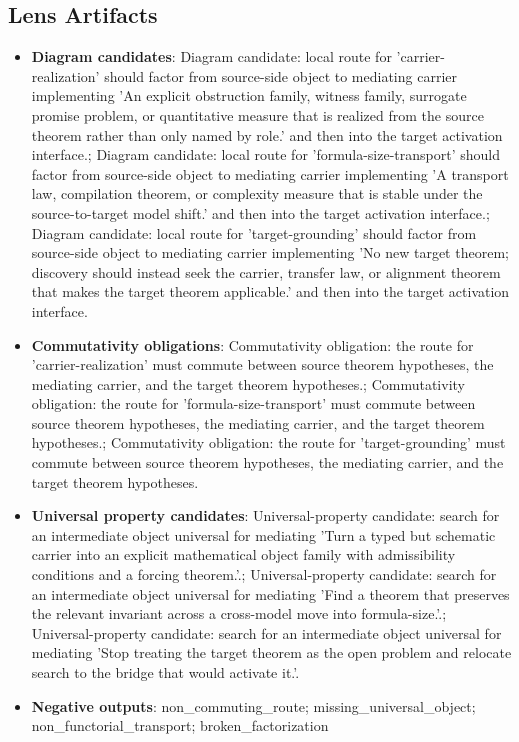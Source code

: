 \documentclass[11pt]{article}
\begin{document}
\subsection*{Lens Artifacts}
\begin{itemize}[leftmargin=*,itemsep=0.2em]
\item \textbf{Diagram candidates}: Diagram candidate: local route for 'carrier-realization' should factor from source-side object to mediating carrier implementing 'An explicit obstruction family, witness family, surrogate promise problem, or quantitative measure that is realized from the source theorem rather than only named by role.' and then into the target activation interface.; Diagram candidate: local route for 'formula-size-transport' should factor from source-side object to mediating carrier implementing 'A transport law, compilation theorem, or complexity measure that is stable under the source-to-target model shift.' and then into the target activation interface.; Diagram candidate: local route for 'target-grounding' should factor from source-side object to mediating carrier implementing 'No new target theorem; discovery should instead seek the carrier, transfer law, or alignment theorem that makes the target theorem applicable.' and then into the target activation interface.
\item \textbf{Commutativity obligations}: Commutativity obligation: the route for 'carrier-realization' must commute between source theorem hypotheses, the mediating carrier, and the target theorem hypotheses.; Commutativity obligation: the route for 'formula-size-transport' must commute between source theorem hypotheses, the mediating carrier, and the target theorem hypotheses.; Commutativity obligation: the route for 'target-grounding' must commute between source theorem hypotheses, the mediating carrier, and the target theorem hypotheses.
\item \textbf{Universal property candidates}: Universal-property candidate: search for an intermediate object universal for mediating 'Turn a typed but schematic carrier into an explicit mathematical object family with admissibility conditions and a forcing theorem.'.; Universal-property candidate: search for an intermediate object universal for mediating 'Find a theorem that preserves the relevant invariant across a cross-model move into formula-size.'.; Universal-property candidate: search for an intermediate object universal for mediating 'Stop treating the target theorem as the open problem and relocate search to the bridge that would activate it.'.
\item \textbf{Negative outputs}: non\_commuting\_route; missing\_universal\_object; non\_functorial\_transport; broken\_factorization
\end{itemize}
\end{document}
